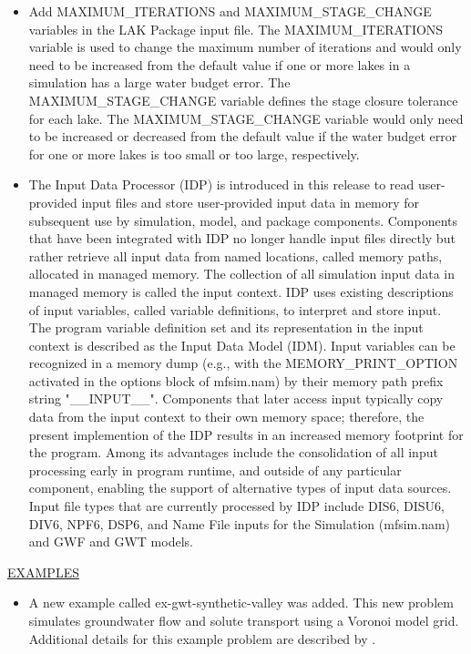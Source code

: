 \begin{itemize}
		\item Add MAXIMUM\_ITERATIONS and MAXIMUM\_STAGE\_CHANGE variables in the LAK Package input file. The MAXIMUM\_ITERATIONS variable is used to change the maximum number of iterations and would only need to be increased from the default value if one or more lakes in a simulation has a large water budget error.  The MAXIMUM\_STAGE\_CHANGE variable defines the stage closure tolerance for each lake. The MAXIMUM\_STAGE\_CHANGE variable would only need to be increased or decreased from the default value if the water budget error for one or more lakes is too small or too large, respectively. 
		\item The Input Data Processor (IDP) is introduced in this release to read user-provided input files and store user-provided input data in memory for subsequent use by simulation, model, and package components.  Components that have been integrated with IDP no longer handle input files directly but rather retrieve all input data from named locations, called memory paths, allocated in managed memory.  The collection of all simulation input data in managed memory is called the input context.  IDP uses existing descriptions of input variables, called variable definitions, to interpret and store input.  The program variable definition set and its representation in the input context is described as the Input Data Model (IDM).  Input variables can be recognized in a memory dump (e.g., with the MEMORY\_PRINT\_OPTION activated in the options block of mfsim.nam) by their memory path prefix string "\_\_INPUT\_\_".  Components that later access input typically copy data from the input context to their own memory space; therefore, the present implemention of the IDP results in an increased memory footprint for the program.  Among its advantages include the consolidation of all input processing early in program runtime, and outside of any particular component, enabling the support of alternative types of input data sources.  Input file types that are currently processed by IDP include DIS6, DISU6, DIV6, NPF6, DSP6, and Name File inputs for the Simulation (mfsim.nam) and GWF and GWT models.
	\end{itemize}

	\underline{EXAMPLES}
	\begin{itemize}
		\item A new example called ex-gwt-synthetic-valley was added.  This new problem simulates groundwater flow and solute transport using a Voronoi model grid.  Additional details for this example problem are described by \cite{hughes2023flopy}.
	\end{itemize}

